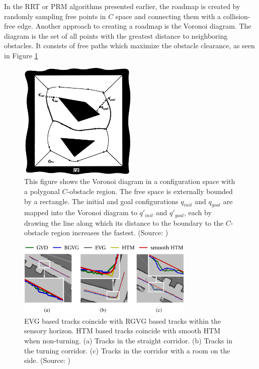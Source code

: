 In the RRT or PRM algorithms presented earlier, the roadmap is created by randomly sampling free points in \(C\) space and connecting them with a collision-free edge. Another approach to creating a roadmap is the Voronoi diagram. The diagram is the set of all points with the greatest distance to neighboring obstacles. It consists of free paths which maximize the obstacle clearance, as seen in Figure \ref{fig:voronoi_diagram}
\begin{figure}[h]
    \centering
    \includegraphics[width=0.5\textwidth]{figures/20_state_of_the_art/voronoi_diagram.png}
    \caption[The Voronoi diagram]{This figure shows the Voronoi diagram in a configuration space with a polygonal \(C\)-obstacle region. The free space is externally bounded by a rectangle. The initial and goal configurations \(q_{init}\) and \(q_{goal}\) are mapped into the Voronoi diagram to \(q'_{init}\) and \(q'_{goal}\), each by drawing the line along which its distance to the boundary to the \(C\)-obstacle region increases the fastest. (Source: \cite{latombe_robot_2003})}
    \label{fig:voronoi_diagram}
\end{figure}
\begin{figure}[b]
    \centering
    \includegraphics[width=0.75\textwidth]{figures/20_state_of_the_art/htm_path_comparison.png}
    \caption[Comparison between straight paths]{EVG based tracks coincide with RGVG based tracks within the sensory horizon. HTM based tracks coincide with smooth HTM when non-turning. (a) Tracks in the straight corridor. (b) Tracks in the turning corridor. (c) Tracks in the corridor with a room on the side. (Source: \cite{hou_straight_2021})}
    \label{fig:htm_path_comparison}
\end{figure}
